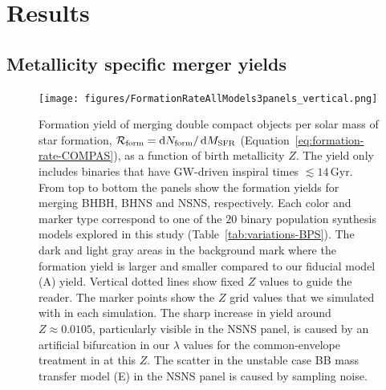 \documentclass[fleqn,usenatbib]{mnras}
\newcommand\COMPAS{{\sc{COMPAS }}}
\newcommand{\Zi}{\ensuremath{Z}\xspace}
\newcommand{\Gyr}{\ensuremath{\,\mathrm{Gyr}}\xspace}
\newcommand{\MSFR}{\ensuremath{{M}_{\rm{SFR}}}\xspace}
\newcommand*\diff{\mathop{}\!\mathrm{d}}
\newcommand{\NmodelsBPS}{\ensuremath{20}\xspace}
\begin{document}



\section{Results}
\label{section:results}
%

\subsection{Metallicity specific merger yields}
\label{section:Formation-rates-per-metallicity}
%

\begin{figure}
    \centering
\texttt{[image: figures/FormationRateAllModels3panels\_vertical.png]}
\caption{Formation yield of merging double compact objects  per solar mass of star formation, $\mathcal{R}_{\rm{form}} = \diff N_{\rm{form}} / \diff \MSFR$ (Equation~\ref{eq:formation-rate-COMPAS}), as a function of birth metallicity \Zi. The yield only includes binaries that have \ac{GW}-driven inspiral times  $\lesssim 14\Gyr$. 
From top to bottom the panels show the formation yields for merging \ac{BHBH}, \ac{BHNS} and \ac{NSNS}, respectively. Each color and marker type correspond to one of the \NmodelsBPS binary population synthesis models explored in this study (Table~\ref{tab:variations-BPS}). The dark and light gray areas in the background mark where the formation yield is larger and smaller compared to our fiducial model (A) yield. Vertical dotted lines show fixed \Zi values to guide the reader. The marker points show the \Zi grid values that we simulated with {\COMPAS} in each simulation. The sharp increase in yield around $\Zi \approx 0.0105$, particularly visible in the \ac{NSNS} panel, is caused by an artificial bifurcation in our $\lambda$ values for the common-envelope treatment in \COMPAS at this \Zi. The scatter in the unstable case BB mass transfer model (E) in the \ac{NSNS} panel is caused by sampling noise. \href{https://github.com/FloorBroekgaarden/Double-Compact-Object-Mergers/blob/main/plottingCode/Fig_1_and_Fig_A1/FormationRateAllModels3panels_vertical.pdf}{\faFileImage} \href{https://github.com/FloorBroekgaarden/Double-Compact-Object-Mergers/blob/main/plottingCode/Fig_1_and_Fig_A1/make_Fig_1_and_Fig_A1.ipynb}{\faBook}}
%
    \label{fig:FormationRateDCO-per-metallicity}
\end{figure}
%
\end{document}

